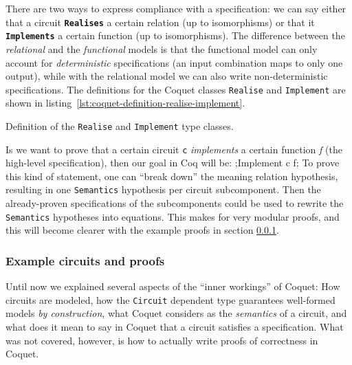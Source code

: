             There are two ways to express compliance with a specification: we can say either that a
            circuit \texttt{\textbf{Realises}} a certain relation (up to isomorphisms) or that it
            \texttt{\textbf{Implements}} a certain function (up to isomorphisms). The difference
            between the \emph{relational} and the \emph{functional} models is that the functional
            model can only account for \emph{deterministic} specifications (an input combination
            maps to only one output), while with the relational model we can also write
            non-deterministic specifications. The definitions for the Coquet classes
            \texttt{Realise} and \texttt{Implement} are shown in
            listing~\ref{lst:coquet-definition-realise-implement}.

            \begin{listing}[h!]
                \caption{Definition of the \texttt{Realise} and \texttt{Implement} type classes.
                    \label{lst:coquet-definition-realise-implement}}
            \end{listing}

            Is we want to prove that a certain circuit \texttt{c} \emph{implements} a certain
            function \emph{f} (the high-level specification), then our goal in Coq will be:
            \coq;Implement c f; To prove this kind of statement, one can ``break down'' the meaning
            relation hypothesis, resulting in one \texttt{Semantics} hypothesis per circuit
            subcomponent.  Then the already-proven specifications of the subcomponents could be used
            to rewrite the \texttt{Semantics} hypotheses into equations. This makes for very modular
            proofs, and this will become clearer with the example proofs in section
            \ref{subsubsec:coquet-circuits}.


        \subsubsection{Example circuits and proofs}
        \label{subsubsec:coquet-circuits}
            Until now we explained several aspects of the ``inner workings'' of Coquet: How
            circuits are modeled, how the \texttt{Circuit} dependent type guarantees well-formed
            models \emph{by construction}, what Coquet considers as the \emph{semantics} of a
            circuit, and what does it mean to say in Coquet that a circuit satisfies a
            specification. What was not covered, however, is how to actually write proofs of
            correctness in Coquet.

